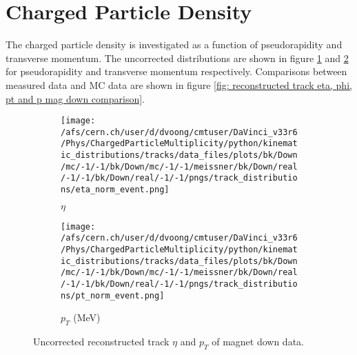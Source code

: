 \section{Charged Particle Density}
\label{section: charged particle density}

The charged particle density is investigated as a function of pseudorapidity and transverse momentum. The uncorrected distributions are shown in figure \ref{fig: reconstructed eta mag down} and \ref{fig: reconstructed pt mag down} for pseudorapidity and transverse momentum respectively. Comparisons between measured data and MC data are shown in figure \ref{fig: reconstructed track eta, phi, pt and p mag down comparison}.

\begin{figure}[h]
	\begin{subfigure}[h]{0.49\textwidth}
		\texttt{[image: /afs/cern.ch/user/d/dvoong/cmtuser/DaVinci\_v33r6/Phys/ChargedParticleMultiplicity/python/kinematic\_distributions/tracks/data\_files/plots/bk/Down/mc/-1/-1/bk/Down/mc/-1/-1/meissner/bk/Down/real/-1/-1/bk/Down/real/-1/-1/pngs/track\_distributions/eta\_norm\_event.png]}
		\caption{$\eta$}
		\label{fig: reconstructed eta mag down}
	\end{subfigure}
	\centering
	\begin{subfigure}[h]{0.49\textwidth}
		\texttt{[image: /afs/cern.ch/user/d/dvoong/cmtuser/DaVinci\_v33r6/Phys/ChargedParticleMultiplicity/python/kinematic\_distributions/tracks/data\_files/plots/bk/Down/mc/-1/-1/bk/Down/mc/-1/-1/meissner/bk/Down/real/-1/-1/bk/Down/real/-1/-1/pngs/track\_distributions/pt\_norm\_event.png]}
		\caption{$p_T$ (MeV)}
		\label{fig: reconstructed pt mag down}
	\end{subfigure}
	\caption{Uncorrected reconstructed track $\eta$ and $p_T$ of magnet down data.}
	\label{fig: reconstructed track eta, phi, pt and p mag down}
\end{figure}

